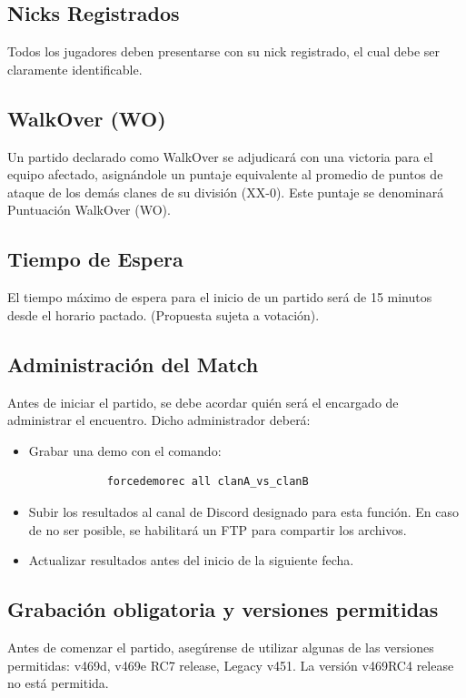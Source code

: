 \documentclass[a4paper, 11pt]{article}
\begin{document}
    \subsection{Nicks Registrados}
    Todos los jugadores deben presentarse con su nick registrado, el cual debe ser claramente identificable.

    \subsection{WalkOver (WO)}
    Un partido declarado como WalkOver se adjudicará con una victoria para el equipo afectado, asignándole un puntaje equivalente al promedio de puntos de ataque de los demás clanes de su división (XX-0). Este puntaje se denominará Puntuación WalkOver (WO).

    \subsection{Tiempo de Espera}
    El tiempo máximo de espera para el inicio de un partido será de 15 minutos desde el horario pactado. (Propuesta sujeta a votación).

    \subsection{Administración del Match}
    Antes de iniciar el partido, se debe acordar quién será el encargado de administrar el encuentro. Dicho administrador deberá:

    \begin{itemize}
        \item Grabar una demo con el comando:
        \begin{lstlisting}
            forcedemorec all clanA_vs_clanB
        \end{lstlisting}
        \item Subir los resultados al canal de Discord designado para esta función. En caso de no ser posible, se habilitará un FTP para compartir los archivos.
        \item Actualizar resultados antes del inicio de la siguiente fecha.
    \end{itemize}

    \subsection{Grabación obligatoria y versiones permitidas}
    Antes de comenzar el partido, asegúrense de utilizar algunas de las versiones permitidas: v469d, v469e  RC7 release, Legacy v451. La versión v469RC4 release no está permitida.
\end{document}
